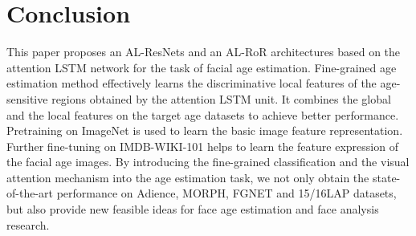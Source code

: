 \documentclass[journal]{IEEEtran}
\begin{document}
\section{Conclusion}
This paper proposes an AL-ResNets and an AL-RoR architectures based on the attention LSTM network for the task of facial age estimation. Fine-grained age estimation method effectively learns the discriminative local features of the age-sensitive regions obtained by the attention LSTM unit. It combines the global and the local features on the target age datasets to achieve better performance. Pretraining on ImageNet is used to learn the basic image feature representation. Further fine-tuning on IMDB-WIKI-101 helps to learn the feature expression of the facial age images. By introducing the fine-grained classification and the visual attention mechanism into the age estimation task, we not only obtain the state-of-the-art performance on Adience, MORPH, FGNET and 15/16LAP datasets, but also provide new feasible ideas for face age estimation and face analysis research.







\appendices




\ifCLASSOPTIONcaptionsoff
  \newpage
\fi
\end{document}
